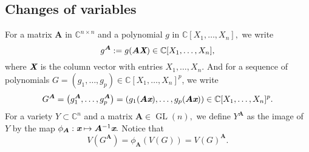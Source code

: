 \documentclass[a4paper]{article}
\def\Xb{\textit{\textbf{X}}}
\def\mA{{\bm A}}
\def\xb{\textit{\textbf{x}}}
\def\fb{\textit{\textbf{f}}}
\DeclareMathOperator{\GL}{GL}
\def\minors{\textrm{Minors}(F,p)}
\def\pa{\partial}
\def\C{\mathbb{C}}
\def\Wi{W(\pi_i,V)}
\def\Ii{\mathfrak{I}(i,F)}
\def\td{{\bf todo}}
\begin{document}
%
%
%
%
%
\subsection{Changes of variables}
For a matrix $\mA$ in $\C^{n\times n}$ and a polynomial $g$ in
$\C[X_1,\hdots,X_n],$ we write \[g^\mA:=g(\mA \Xb) \in
\C[X_1,\dots,X_n],\] where $\Xb$ is the column vector with entries
$X_1,\dots,X_n$. And for a sequence of polynomials $G=(g_1,\hdots,g_p) \in \C[X_1,\hdots,X_n]^p$, we write 
\[
G^{\mA} = \left(g_1^{\mA},\hdots,g_p^{\mA}\right) = \left(g_1({\mA}\xb),\hdots,g_p({\mA}\xb)\right) \in \C[X_1,\hdots,X_n]^p. 
\]
For a variety $Y \subset \C^n$ and a matrix $\mA \in \GL(n),$ we  define $Y^{\mA}$ as the image of $Y$ by the map $\phi_{\mA} : \xb \mapsto \mA^{-1}\xb.$ Notice that 
\[
V(G^{\mA}) = \phi_{\mA}(V(G)) = V(G)^{\mA}. 
\]
\end{document}
